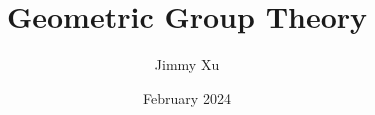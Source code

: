 \documentclass[11pt]{scrartcl}
\begin{document}
\title{Geometric Group Theory}
\author{Jimmy Xu}
\date{February 2024}


\maketitle


\newpage

\newpage

\end{document}

